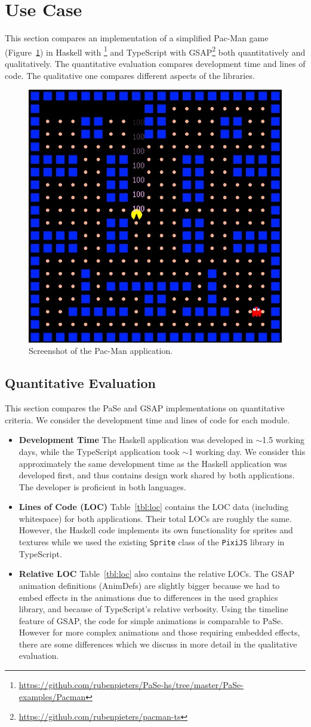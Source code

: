 \section{Use Case}

This section compares an implementation of a simplified Pac-Man game (Figure~\ref{fig:pacman}) in Haskell
with \dsl{}\footnote{\url{https://github.com/rubenpieters/PaSe-hs/tree/master/PaSe-examples/Pacman}} and TypeScript with GSAP\footnote{\url{https://github.com/rubenpieters/pacman-ts}} both quantitatively and qualitatively. The
quantitative evaluation compares development time and lines
of code. The qualitative one compares different aspects of the 
libraries.

\begin{figure}[h]{\textwidth}
\centering
\includegraphics[width=.3\textwidth]{pictures/pacman}
\caption{Screenshot of the Pac-Man application.}
\label{fig:pacman}
\end{figure}

\subsection{Quantitative Evaluation}

This section compares the PaSe and GSAP implementations on
quantitative criteria. We consider the development time and lines of code for
each module.

\begin{itemize}
\item \textbf{Development Time} The Haskell application was developed in
$\sim$1.5 working days, while the TypeScript application took $\sim$1 working
day. We consider this approximately the same development time as the Haskell application
was developed first, and thus contains design work shared by both
applications. The developer is proficient in both languages.
\item \textbf{Lines of Code (LOC)} Table~\ref{tbl:loc} contains the LOC data
(including whitespace) for both applications. Their total LOCs are roughly the same. However, the Haskell
code implements its own functionality for sprites and
textures while we used the existing
\texttt{Sprite} class of the \texttt{PixiJS} library in TypeScript.
\item \textbf{Relative LOC} Table~\ref{tbl:loc} also contains the relative
LOCs. The GSAP animation definitions (AnimDefs) are slightly bigger because
we had to embed effects in the animations due to differences
in the used graphics library, and because of TypeScript's relative verbosity.
Using the timeline feature of GSAP, the code for
simple animations is comparable to PaSe. However for more complex animations
and those requiring embedded effects, there are some differences which we
discuss in more detail in the qualitative evaluation.
\end{itemize}

